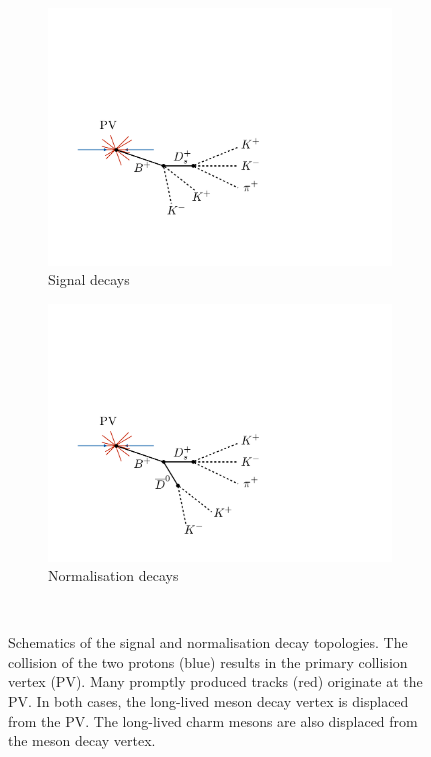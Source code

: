 \begin{figure}[!h]
    \centering
    \begin{subfigure}[t]{0.4\textwidth}
        \includegraphics[width=1.0\textwidth]{figs/Selection/B2DsKK_topology.pdf}
        \caption{Signal decays}
    \end{subfigure}%
    \begin{subfigure}[t]{0.4\textwidth}
        \includegraphics[width=1.0\textwidth]{figs/Selection/B2DsD0_topology.pdf}
        \caption{Normalisation decays}
    \end{subfigure}\\
    \caption{Schematics of the signal and normalisation decay topologies. The collision of the two protons (blue) results in the primary collision vertex (PV). Many promptly produced tracks (red) originate at the PV. In both cases, the long-lived \Bp meson decay vertex is displaced from the PV. The long-lived charm mesons are also displaced from the \Bp meson decay vertex.}
    \label{fig:topo}   
\end{figure}


